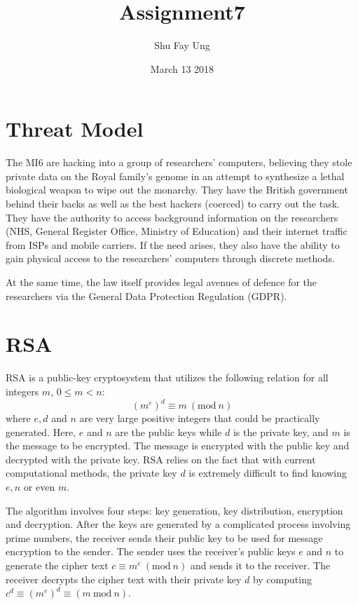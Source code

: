 \documentclass{article}
\title{Assignment7}
\author{Shu Fay Ung}
\date{March 13 2018}
\begin{document}
\maketitle

\section{Threat Model}
    The MI6 are hacking into a group of researchers' computers, believing they stole private data on the Royal family's genome in an attempt to synthesize a lethal biological weapon to wipe out the monarchy. They have the British government behind their backs as well as the best hackers (coerced) to carry out the task. They have the authority to access background information on the researchers (NHS, General Register Office, Ministry of Education) and their internet traffic from ISPs and mobile carriers. If the need arises, they also have the ability to gain physical access to the researchers' computers through discrete methods. 
    
    At the same time, the law itself provides legal avenues of defence for the researchers via the General Data Protection Regulation (GDPR).

\section{RSA}
    RSA is a public-key cryptosystem that utilizes the following relation for all integers $m$, $0 \leq m < n$:
    $$(m^e)^d \equiv m \ (\mathrm{mod} \ n)$$
    where $e, d$ and $n$ are very large positive integers that could be practically generated. Here, $e$ and $n$ are the public keys while $d$ is the private key, and $m$ is the message to be encrypted. The message is encrypted with the public key and decrypted with the private key. RSA relies on the fact that with current computational methods, the private key $d$ is extremely difficult to find knowing $e, n$ or even $m$.
    
    The algorithm involves four steps: key generation, key distribution, encryption and decryption. After the keys are generated by a complicated process involving prime numbers, the receiver sends their public key to be used for message encryption to the sender. The sender uses the receiver's public keys $e$ and $n$ to generate the cipher text $c \equiv m^e \ (\mathrm{mod} \ n)$ and sends it to the receiver. The receiver decrypts the cipher text with their private key $d$ by computing $c^d \equiv (m^e)^d \equiv (m \ \mathrm{mod} \ n)$.
    
\end{document}
